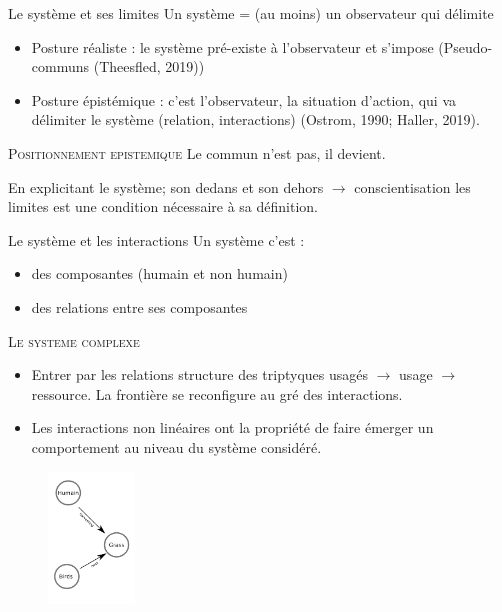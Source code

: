 \documentclass[newPxFont]{beamer}
\begin{document}
\begin{frame}[c]{Le système et ses limites}
\vspace{-1cm}
Un système = (au moins) un observateur qui délimite
\begin{itemize}
  \item Posture réaliste : le système pré-existe à l'observateur et s'impose (Pseudo-communs (Theesfled, 2019))
  \item Posture épistémique : c'est l'observateur, la situation d'action, qui va délimiter le système (relation, interactions) (Ostrom, 1990; Haller, 2019).
\end{itemize}

\small{
  \begin{alertblock}{\textsc{Positionnement epistemique}}
      Le commun n'est pas, il devient.
  \end{alertblock}
}

En explicitant le système; son dedans et son dehors $\rightarrow$  conscientisation les limites est une condition nécessaire à sa définition.


\end{frame}

\begin{frame}[c]{Le système et les interactions}
\vspace{-1cm}
Un système c'est :
\begin{itemize}
  \item des composantes (humain et non humain)
  \item des relations entre ses composantes
\end{itemize}

\small{
  \begin{alertblock}{\textsc{Le systeme complexe}}
      \begin{itemize}
        \item Entrer par les relations structure des triptyques usagés $\rightarrow$ usage $\rightarrow$ ressource. La frontière se reconfigure au gré des interactions.
        \item Les interactions non linéaires ont la propriété de faire émerger un comportement au niveau du système considéré.
      \end{itemize}

  \end{alertblock}
}
\begin{figure}
  \includegraphics[height=3.5cm]{img/ReHab_network.png}
\end{figure}

\end{frame}
\end{document}
